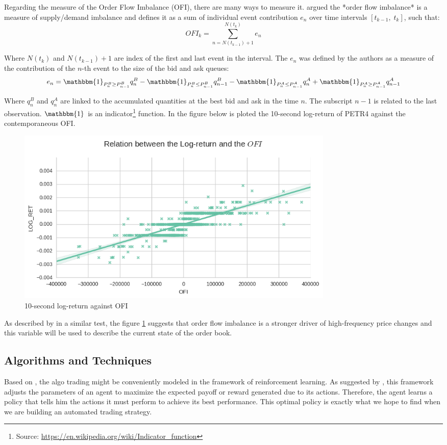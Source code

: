 \documentclass[a4paper]{article}
\begin{document}
Regarding the measure of the Order Flow Imbalance (OFI), there are many ways to measure it. \cite{cont2014price} argued the *order flow imbalance* is a measure of supply/demand imbalance and defines it as a sum of individual event contribution $e_n$ over time intervals $\left[ t_{k-1}, \; t_k \right]$, such that:
$$OFI_k = \sum^{N(t_k)}_{n=N(t_{k-1})+1} e_n$$

Where $N(t_k)$ and $N(t_{k-1}) + 1$ are index of the first and last event in the interval. The $e_n$ was defined by the authors as a measure of the contribution of the $n$-th event to the size of the bid and ask queues:
$$e_n = \mathbbm{1}_{P_{n}^{B} \geq P_{n-1}^{B}} q^{B}_{n} - \mathbbm{1}_{P_{n}^{B} \leq P_{n-1}^{B}}  q^{B}_{n-1} - \mathbbm{1}_{P_{n}^{A} \leq P_{n-1}^{A}} q^{A}_{n} + \mathbbm{1}_{P_{n}^{A} \geq P_{n-1}^{A}}  q^{A}_{n-1}$$

Where $q^{B}_{n}$ and $q^{A}_{n}$ are linked to the accumulated quantities at the best bid and ask in the time $n$. The subscript $n-1$ is related to the last observation. $\mathbbm{1}$ is an indicator\footnote{Source: \url{https://en.wikipedia.org/wiki/Indicator_function}} function. In the figure below is ploted the 10-second log-return of PETR4 against the contemporaneous OFI.

\begin{figure}[ht!]
\centering
\includegraphics[width=0.75\textwidth]{figures/ofi_logret.png}
\caption{\label{fig:ofi_linear}10-second log-return against OFI}
\end{figure}

As described by \cite{cont2014price} in a similar test, the figure \ref{fig:ofi_linear} suggests that order flow imbalance is a stronger driver of high-frequency price changes and this variable will be used to describe the current state of the order book.

\subsection{Algorithms and Techniques}
Based on \cite{cont2014price}, the algo trading might be conveniently modeled in the framework of reinforcement learning. As suggested by \cite{du1algorithm}, this framework adjusts the parameters of an agent to maximize the expected payoff or reward generated due to its actions. Therefore, the agent learns a policy that tells him the actions it must perform to achieve its best performance. This optimal policy is exactly what we hope to find when we are building an automated trading strategy.
\end{document}
